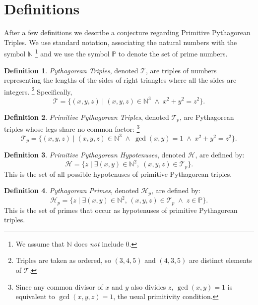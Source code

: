 \documentclass{article}
\theoremstyle{plain}
\theoremstyle{definition}
\newtheorem{defn}{Definition}
\theoremstyle{remark}
\begin{document}
\section{Definitions}
After a few definitions we describe a conjecture regarding Primitive 
Pythagorean Triples. We use standard notation, associating the natural 
numbers with the symbol $\mathbb{N}$%
\footnote{We assume that $\mathbb{N}$ does {\em not\/} include $0$.}
and we use the symbol $\mathbb{P}$ to denote the set of prime numbers.


\begin{defn}
{\em Pythagorean Triples\/}, denoted $\mathcal{T}$, are triples of
numbers representing the lengths of the sides of right triangles where all the sides are integers.%
\footnote{Triples are taken as ordered, so $(3,4,5)$ and $(4,3,5)$ are
distinct elements of $\mathcal{T}$.}
Specifically,
\begin{equation}
  \mathcal{T} = \{ (x,y,z) \; | \; (x,y,z) \in \mathbb{N}^3 \; \wedge \; x^2 + y^2 = z^2 \}.
\end{equation}
\end{defn}

\begin{defn}
{\em Primitive Pythagorean Triples\/}, denoted $\mathcal{T}_p$, are
Pythagorean triples whose legs share no common factor:%
\footnote{Since any common divisor of $x$ and $y$ also divides $z$,
$\gcd(x,y) = 1$ is equivalent to $\gcd(x,y,z) = 1$, the usual primitivity condition.}
\begin{equation}
  \mathcal{T}_p = \{ (x,y,z) \; | \; (x,y,z) \in \mathbb{N}^3 \; \wedge \; \gcd(x,y) = 1 \; \wedge \; x^2 + y^2 = z^2 \}.
\end{equation}
\end{defn}

\begin{defn}
{\em Primitive Pythagorean Hypotenuses\/}, denoted $\mathcal{H}$, are defined by:
\begin{equation}
  \mathcal{H} = \{ z \; | \; \exists (x,y) \in \mathbb{N}^2, \;  (x,y,z) \in \mathcal{T}_p \}.
\end{equation}
This is the set of all possible hypotenuses of primitive Pythagorean triples.
\end{defn}

\begin{defn}
{\em Pythagorean Primes\/}, denoted $\mathcal{H}_p$, are defined by:
\begin{equation}
  \mathcal{H}_p = \{ z \; | \; \exists (x,y) \in \mathbb{N}^2, \, (x,y,z) \in \mathcal{T}_p \; \wedge \; z \in \mathbb{P} \}.
\end{equation}
This is the set of primes that occur as hypotenuses of primitive Pythagorean triples.
\end{defn}
\end{document}
